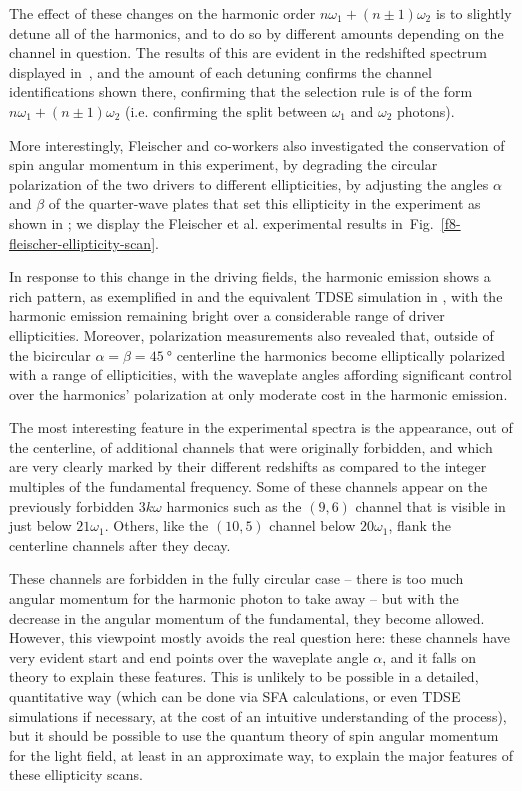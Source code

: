 The effect of these changes on the harmonic order $n\omega_1+(n\pm 1)\omega_2$ is to slightly detune all of the harmonics, and to do so by different amounts depending on the channel in question. The results of this are evident in the redshifted spectrum displayed in~, and the amount of each detuning confirms the channel identifications shown there, confirming that the selection rule is of the form $n\omega_1+(n\pm 1)\omega_2$ (i.e. confirming the split between $\omega_1$ and $\omega_2$ photons).



More interestingly, Fleischer and co-workers also investigated the conservation of spin angular momentum in this experiment, by degrading the circular polarization of the two drivers to different ellipticities, by adjusting the angles $\alpha$ and $\beta$ of the quarter-wave plates that set this ellipticity in the experiment as shown in ; we display the Fleischer et al. experimental results in~Fig.~\ref{f8-fleischer-ellipticity-scan}.



In response to this change in the driving fields, the harmonic emission shows a rich pattern, as exemplified in  and the equivalent TDSE simulation in , with the harmonic emission remaining bright over a considerable range of driver ellipticities. Moreover, polarization measurements also revealed that, outside of the bicircular $\alpha=\beta=\SI{45}{\degree}$ centerline the harmonics become elliptically polarized with a range of ellipticities, with the waveplate angles affording significant control over the harmonics' polarization at only moderate cost in the harmonic emission.

The most interesting feature in the experimental spectra is the appearance, out of the centerline, of additional channels that were originally forbidden, and which are very clearly marked by their different redshifts as compared to the integer multiples of the fundamental frequency. Some of these channels appear on the previously forbidden $3k\omega$ harmonics such as the $(9,6)$ channel that is visible in  just below $21\omega_1$. Others, like the $(10,5)$ channel below $20\omega_1$, flank the centerline channels after they decay. 


These channels are forbidden in the fully circular case -- there is too much angular momentum for the harmonic photon to take away -- but with the decrease in the angular momentum of the fundamental, they become allowed. However, this viewpoint mostly avoids the real question here: these channels have very evident start and end points over the waveplate angle $\alpha$, and it falls on theory to explain these features. This is unlikely to be possible in a detailed, quantitative way (which can be done via SFA calculations, or even TDSE simulations if necessary, at the cost of an intuitive understanding of the process), but it should be possible to use the quantum theory of spin angular momentum for the light field, at least in an approximate way, to explain the major features of these ellipticity scans.


